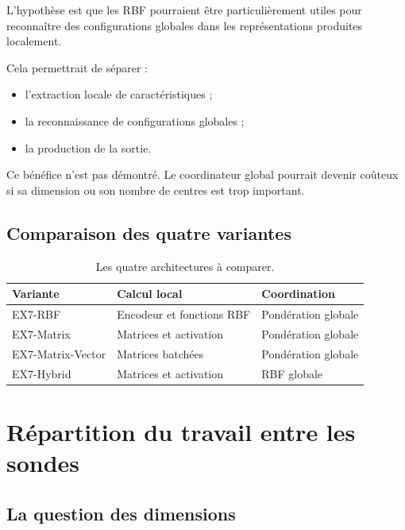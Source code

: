 \documentclass[11pt,a4paper]{report}
\begin{document}
L'hypothèse est que les RBF pourraient être particulièrement
utiles pour reconnaître des configurations globales dans
les représentations produites localement.

Cela permettrait de séparer :

\begin{itemize}
  \item l'extraction locale de caractéristiques ;
  \item la reconnaissance de configurations globales ;
  \item la production de la sortie.
\end{itemize}

Ce bénéfice n'est pas démontré. Le coordinateur global
pourrait devenir coûteux si sa dimension ou son nombre
de centres est trop important.

\section{Comparaison des quatre variantes}

\begin{table}[H]
\centering
\small
\begin{tabularx}{\textwidth}{
  >{\raggedright\arraybackslash}p{2.4cm}
  X
  >{\raggedright\arraybackslash}p{2.4cm}
}
\toprule
Variante & Calcul local & Coordination\\
\midrule
EX7-RBF
&
Encodeur et fonctions RBF
&
Pondération globale\\

EX7-Matrix
&
Matrices et activation
&
Pondération globale\\

EX7-Matrix-Vector
&
Matrices batchées
&
Pondération globale\\

EX7-Hybrid
&
Matrices et activation
&
RBF globale\\
\bottomrule
\end{tabularx}
\caption{Les quatre architectures à comparer.}
\end{table}

\chapter{Répartition du travail entre les sondes}

\section{La question des dimensions}
\end{document}
